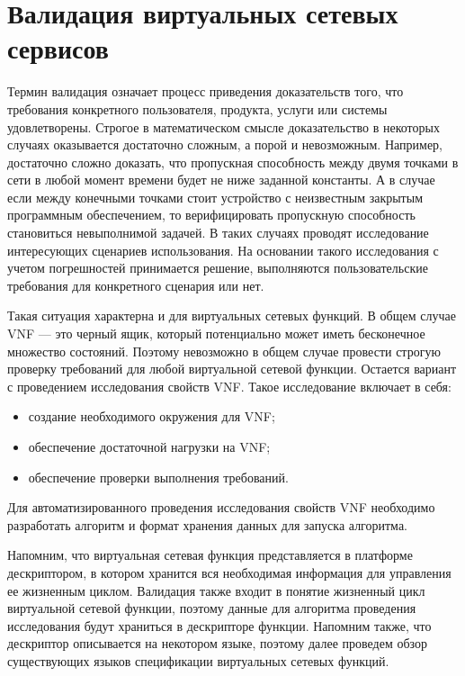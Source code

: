 \documentclass[oneside,final,14pt,a4paper]{extreport}
\begin{document}
\chapter{Валидация виртуальных сетевых сервисов}
\label{chap:vns-validation}
Термин валидация означает процесс приведения доказательств того, что требования конкретного пользователя, продукта, услуги или системы удовлетворены. Строгое в математическом смысле доказательство в некоторых случаях оказывается достаточно сложным, а порой и невозможным. Например, достаточно сложно доказать, что пропускная способность между двумя точками в сети в любой момент времени будет не ниже заданной константы. А в случае если между конечными точками стоит устройство с неизвестным закрытым программным обеспечением, то верифицировать пропускную способность становиться невыполнимой задачей. В таких случаях проводят исследование интересующих сценариев использования. На основании такого исследования с учетом погрешностей принимается решение, выполняются пользовательские требования для конкретного сценария или нет.

Такая ситуация характерна и для виртуальных сетевых функций. В общем случае VNF --- это черный ящик, который потенциально может иметь бесконечное множество состояний. Поэтому невозможно в общем случае провести строгую проверку требований для любой виртуальной сетевой функции. Остается вариант с проведением исследования свойств VNF. Такое исследование включает в себя:
\begin{itemize}
    \item создание необходимого окружения для VNF;
    \item обеспечение достаточной нагрузки на VNF;
    \item обеспечение проверки выполнения требований.
\end{itemize}

Для автоматизированного проведения исследования свойств VNF необходимо разработать алгоритм и формат хранения данных для запуска алгоритма.

Напомним, что виртуальная сетевая функция представляется в платформе дескриптором, в котором хранится вся необходимая информация для управления ее жизненным циклом. Валидация также входит в понятие жизненный цикл виртуальной сетевой функции, поэтому данные для алгоритма проведения исследования будут храниться в дескрипторе функции. Напомним также, что дескриптор описывается на некотором языке, поэтому далее проведем обзор существующих языков спецификации виртуальных сетевых функций.
\end{document}

